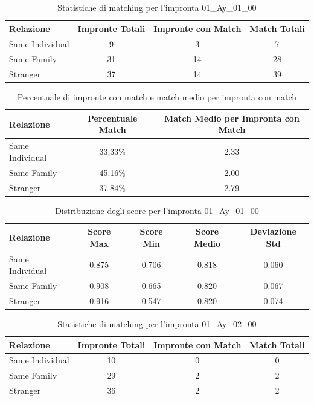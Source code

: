 \begin{table}[htbp]
\centering
\caption{Statistiche di matching per l'impronta 01\_Ay\_01\_00}
\label{tab:results_01_Ay_01_00}
\begin{tabular}{|l|c|c|c|}
\hline
\textbf{Relazione} & \textbf{Impronte Totali} & \textbf{Impronte con Match} & \textbf{Match Totali} \\
\hline
Same Individual & 9 & 3 & 7 \\
\hline
Same Family & 31 & 14 & 28 \\
\hline
Stranger & 37 & 14 & 39 \\
\hline
\end{tabular}
\end{table}


\begin{table}[htbp]
\centering
\caption{Percentuale di impronte con match e match medio per impronta con match}
\label{tab:match_percentage_01_Ay_01_00}
\begin{tabular}{|l|c|c|}
\hline
\textbf{Relazione} & \textbf{Percentuale Match} & \textbf{Match Medio per Impronta con Match} \\
\hline
Same Individual & 33.33\% & 2.33 \\
\hline
Same Family & 45.16\% & 2.00 \\
\hline
Stranger & 37.84\% & 2.79 \\
\hline
\end{tabular}
\end{table}


\begin{table}[htbp]
\centering
\caption{Distribuzione degli score per l'impronta 01\_Ay\_01\_00}
\label{tab:scores_01_Ay_01_00}
\begin{tabular}{|l|c|c|c|c|}
\hline
\textbf{Relazione} & \textbf{Score Max} & \textbf{Score Min} & \textbf{Score Medio} & \textbf{Deviazione Std} \\
\hline
Same Individual & 0.875 & 0.706 & 0.818 & 0.060 \\
\hline
Same Family & 0.908 & 0.665 & 0.820 & 0.067 \\
\hline
Stranger & 0.916 & 0.547 & 0.820 & 0.074 \\
\hline
\end{tabular}
\end{table}


\begin{table}[htbp]
\centering
\caption{Statistiche di matching per l'impronta 01\_Ay\_02\_00}
\label{tab:results_01_Ay_02_00}
\begin{tabular}{|l|c|c|c|}
\hline
\textbf{Relazione} & \textbf{Impronte Totali} & \textbf{Impronte con Match} & \textbf{Match Totali} \\
\hline
Same Individual & 10 & 0 & 0 \\
\hline
Same Family & 29 & 2 & 2 \\
\hline
Stranger & 36 & 2 & 2 \\
\hline
\end{tabular}
\end{table}


